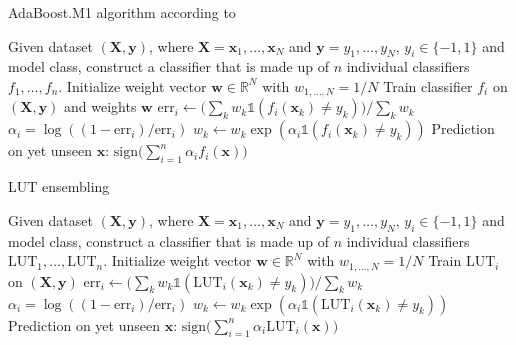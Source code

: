 \begin{algorithm}
  \caption{AdaBoost.M1 algorithm according to \cite{adaboostm1}} \label{alg:adaboostm1}
  \begin{algorithmic}
    \State Given dataset $(\bm{X}, \bm{y})$, where $\bm{X} = \bm{x}_1, \dots, \bm{x}_N$ and $\bm{y} = y_1, \dots, y_N$, $y_i \in \{-1, 1\}$ and model class, construct a classifier that is made up of $n$ individual classifiers $f_1, \dots, f_n$.
    \vspace{1em}
    \State Initialize weight vector $\bm{w} \in \mathds{R}^N$ with $w_{1, \dots, N} = 1/N$
    \vspace{0.5em}
    \State Train classifier $f_i$ on $(\bm{X},\bm{y})$ and weights $\bm{w}$
    \State $\text{err}_i \gets \big( \sum_k w_k \mathbb{1}(f_i(\bm{x}_k) \neq y_k) \big) / \sum_k w_k$
    \State $\alpha_i = \log((1 - \text{err}_i) / \text{err}_i)$
    \State $w_k \gets w_k \exp(\alpha_i \mathbb{1}(f_i(\bm{x}_k) \neq y_k))$
    \EndFor
    \EndFor
    \State Prediction on yet unseen $\bm{x}$: $\text{sign} \big( \sum_{i = 1}^n \alpha_i f_i(\bm{x}) \big)$
  \end{algorithmic}
\end{algorithm}

\begin{algorithm}
  \caption{LUT ensembling}\label{alg:lut_ensemble}
  \begin{algorithmic}
    \State Given dataset $(\bm{X}, \bm{y})$, where $\bm{X} = \bm{x}_1, \dots, \bm{x}_N$ and $\bm{y} = y_1, \dots, y_N$, $y_i \in \{-1, 1\}$ and model class, construct a classifier that is made up of $n$ individual classifiers $\text{LUT}_1, \dots, \text{LUT}_n$.
    \vspace{1em}
    \State Initialize weight vector $\bm{w} \in \mathds{R}^N$ with $w_{1, \dots, N} = 1/N$
    \vspace{0.5em}
    \State Train $\text{LUT}_i$ on $(\bm{X},\bm{y})$
    \State $\text{err}_i \gets \big( \sum_k w_k \mathbb{1}(\text{LUT}_i(\bm{x}_k) \neq y_k) \big) / \sum_k w_k$
    \State $\alpha_i = \log((1 - \text{err}_i) / \text{err}_i)$
    \State $w_k \gets w_k \exp(\alpha_i \mathbb{1}(\text{LUT}_i(\bm{x}_k) \neq y_k))$
    \EndFor
    \EndFor
    \State Prediction on yet unseen $\bm{x}$: $\text{sign} \big( \sum_{i = 1}^n \alpha_i \text{LUT}_i(\bm{x}) \big)$
  \end{algorithmic}
\end{algorithm}

